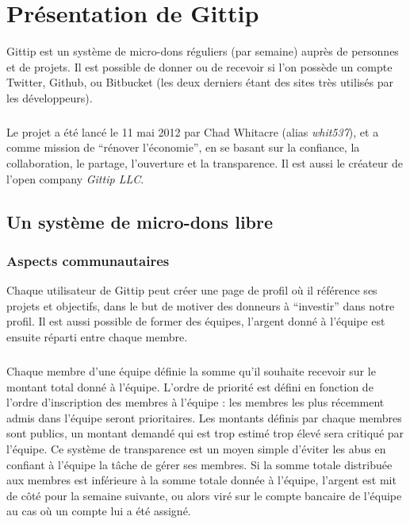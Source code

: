\chapter{Présentation de Gittip}

Gittip est un système de micro-dons réguliers (par semaine) auprès de personnes
et de projets. Il est possible de donner ou de recevoir si l'on possède un
compte Twitter, Github, ou Bitbucket (les deux derniers étant des sites très
utilisés par les développeurs).

\paragraph{}
Le projet a été lancé le 11 mai 2012 par Chad Whitacre (alias \emph{whit537}),
et a comme mission de ``rénover l'économie'', en se basant sur la confiance, la
collaboration, le partage, l'ouverture et la transparence. Il est aussi le
créateur de l'open company \emph{Gittip LLC}.


    \section{Un système de micro-dons libre}

    \subsection{Aspects communautaires}

Chaque utilisateur de Gittip peut créer une page de profil où il référence ses
projets et objectifs, dans le but de motiver des donneurs à ``investir'' dans
notre profil. Il est aussi possible de former des équipes, l'argent donné à
l'équipe est ensuite réparti entre chaque membre.

\paragraph{}
Chaque membre d'une équipe définie la somme qu'il souhaite recevoir sur le
montant total donné à l'équipe. L'ordre de priorité est défini en fonction de
l'ordre d'inscription des membres à l'équipe : les membres les plus récemment
admis dans l'équipe seront prioritaires. Les montants définis par chaque
membres sont publics, un montant demandé qui est trop estimé trop élevé sera
critiqué par l'équipe. Ce système de transparence est un moyen simple d'éviter
les abus en confiant à l'équipe la tâche de gérer ses membres. Si la somme
totale distribuée aux membres est inférieure à la somme totale donnée à
l'équipe, l'argent est mit de côté pour la semaine suivante, ou alors viré sur
le compte bancaire de l'équipe au cas où un compte lui a été assigné.

